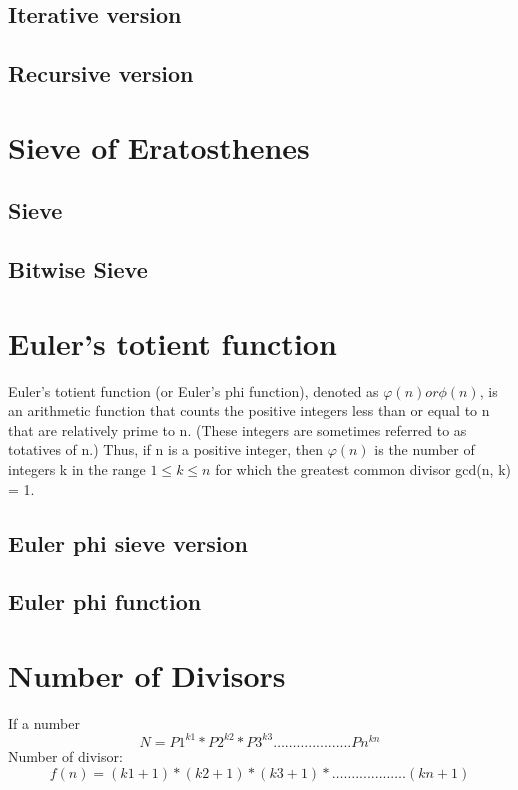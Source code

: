 \documentclass[11pt]{report}
\begin{document}
\subsection{Iterative version}

\subsection{Recursive version}

\section{Sieve of Eratosthenes}
\subsection{Sieve}

\subsection{Bitwise Sieve}

\section{Euler's totient function}
Euler's totient function (or Euler's phi function), denoted as $\varphi (n) or  \phi(n)$, is an arithmetic function that counts the positive integers less than or equal to n that are relatively prime to n. (These integers are sometimes referred to as totatives of n.) Thus, if n is a positive integer, then $\varphi (n)$ is the number of integers k in the range $1 \leq k \leq n$ for which the greatest common divisor gcd(n, k) = 1.
\subsection{Euler phi sieve version}

\subsection{Euler phi function}

\section{Number of Divisors}
If a number $$N= P1^{k1}*P2^{k2}*P3^{k3}………...........Pn^{kn}$$
Number of divisor: $$f(n)=(k1+1)*(k2+1)*(k3+1)*…….........….(kn+1)$$
\end{document}
